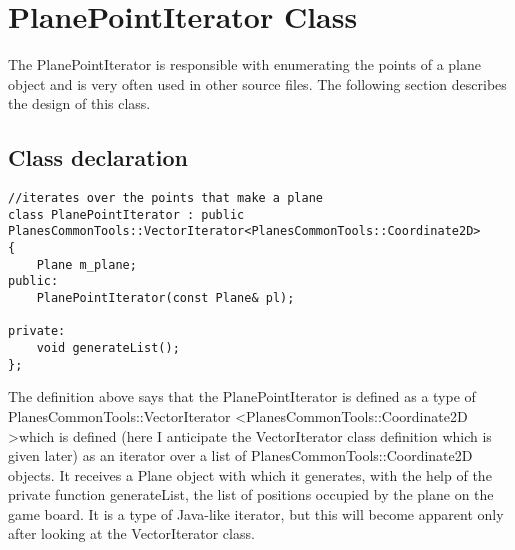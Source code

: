 \section{PlanePointIterator Class}

The PlanePointIterator is responsible with enumerating the points of a plane object and is very often used in other source files. The following section describes the design of this class.

\subsection {Class declaration}

\begin{lstlisting}
//iterates over the points that make a plane
class PlanePointIterator : public PlanesCommonTools::VectorIterator<PlanesCommonTools::Coordinate2D>
{
    Plane m_plane;
public:
    PlanePointIterator(const Plane& pl);

private:
    void generateList();
};
\end{lstlisting}

The definition above says that the PlanePointIterator is defined as a type of PlanesCommonTools::VectorIterator \textless PlanesCommonTools::Coordinate2D \textgreater which is defined (here I anticipate the VectorIterator class definition which is given later) as an iterator over a list of PlanesCommonTools::Coordinate2D objects. It receives a Plane object with which it generates, with the help of the private function generateList, the list of positions occupied by the plane on the game board. It is a type of Java-like iterator, but this will become apparent only after looking at the VectorIterator class. 


